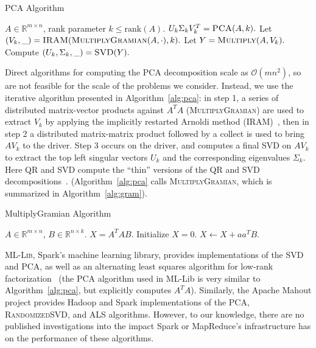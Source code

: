 \begin{algorithm}[tb]
    \caption{\textsc{PCA} Algorithm}
    \label{alg:pca}
    \begin{algorithmic}[1]
      \Require $A \in \mathbb{R}^{m\times n}$, rank parameter $k \leq \textrm{rank}(A).$
      \Ensure $U_k \Sigma_k V_k^T = \textsc{PCA}(A, k).$
      \State Let $(V_k, \_) = \textsc{IRAM}(\textsc{MultiplyGramian}(A, \cdot), k).$
      \State Let $Y = \textsc{Multiply}(A, V_k).$
      \State Compute $(U_k, \Sigma_k, \_) = \textsc{SVD}(Y).$
    \end{algorithmic}
  \end{algorithm}
  
Direct algorithms for computing the PCA decomposition scale as $\mathcal{O}(mn^2)$, so are not feasible for the scale of the problems we consider. Instead, we use the iterative algorithm presented in Algorithm~\ref{alg:pca}: in step 1, a series of distributed matrix-vector products against $A^T A$  (\textsc{MultiplyGramian}) are used to extract $V_k$ by applying the implicitly restarted Arnoldi method (\textsc{IRAM})~\cite{lehoucq1996deflation}, then in step 2 a distributed matrix-matrix product followed by a collect is used to bring $AV_k$ to the driver. Step 3 occurs on the driver, and computes a final SVD on $AV_k$ to extract the top left singular vectors $U_k$ and the corresponding eigenvalues $\Sigma_k.$ Here QR and SVD compute the ``thin'' versions of the QR and SVD decompositions~\cite{GVL96}. (Algorithm~\ref{alg:pca} calls \textsc{MultiplyGramian}, which is summarized in Algorithm~\ref{alg:gram}).

  \begin{algorithm}[tb]
    \caption{{\sc MultiplyGramian} Algorithm}
    \label{alg:gram}
    \begin{algorithmic}[1]
      \Require $A \in \mathbb{R}^{m\times n}$, $B \in \mathbb{R}^{n\times k}$.
      \Ensure $X = A^T A B$.
      \State Initialize $X = 0$.
          \State $X \gets X + a a^T B$.
      \EndFor
    \end{algorithmic}
\end{algorithm}

\textsc{ML-Lib}, Spark's machine learning library, provides implementations of the SVD and PCA, as well as an alternating least squares algorithm for low-rank factorization~\cite{meng2015mllib} (the PCA algorithm used in ML-Lib is very similar to Algorithm~\ref{alg:pca}, but explicitly computes $A^TA$). Similarly, the Apache Mahout project provides Hadoop and Spark implementations of the PCA, \textsc{RandomizedSVD}, and ALS algorithms. However, to our knowledge, there are no published investigations into the impact Spark or MapReduce's infrastructure has on the performance of these algorithms.
  
